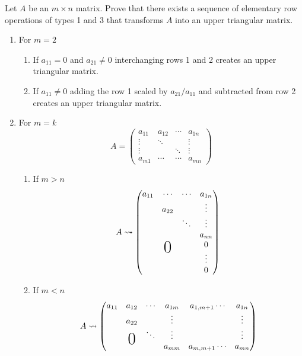 Let $A$ be an $m\times n$ matrix. Prove that there exists a sequence
of elementary row operations of types 1 and 3 that transforms $A$ into
an upper triangular matrix.
\begin{enumerate}
\item For $m = 2$
\begin{enumerate}
\item If $a_{11} = 0$ and $a_{21}\neq 0$ interchanging rows 1 and 2
  creates an upper triangular matrix.
\item If $a_{11} \neq 0$ adding the row 1 scaled by $a_{21}/a_{11}$
  and subtracted from row 2 creates an upper triangular matrix.
\end{enumerate}
\item For $m = k$ 
\begin{equation}
A = \begin{pmatrix}
a_{11} & a_{12} & \cdots & a_{1n}\\
\vdots & \ddots & & \vdots\\
\vdots & & \ddots & \vdots\\
a_{m1} & \cdots & \cdots & a_{mn}
\end{pmatrix}
\end{equation}
\begin{enumerate}
\item If $m> n$
\begin{equation}
A \leadsto \begin{pmatrix}
a_{11} & \cdots & \cdots & a_{1n}\\
& a_{22} & & \vdots\\
& & \ddots & \vdots\\
& & & a_{nn}\\
&\bigzero & & 0\\
& & & \vdots\\
& & & 0
\end{pmatrix}
\end{equation}
\item If $m<n$ 
\begin{equation}
A \leadsto
\begin{pmatrix}
a_{11}& a_{12} & \cdots & a_{1m} & a_{1,m+1} \cdots & a_{1n}\\
& a_{22} & & \vdots & &  \vdots\\
& \bigzero & \ddots & \vdots & &  \vdots\\
& & & a_{mm} & a_{m,m+1} \cdots & a_{mn}\\
\end{pmatrix}
\end{equation}

\end{enumerate}
\end{enumerate}

